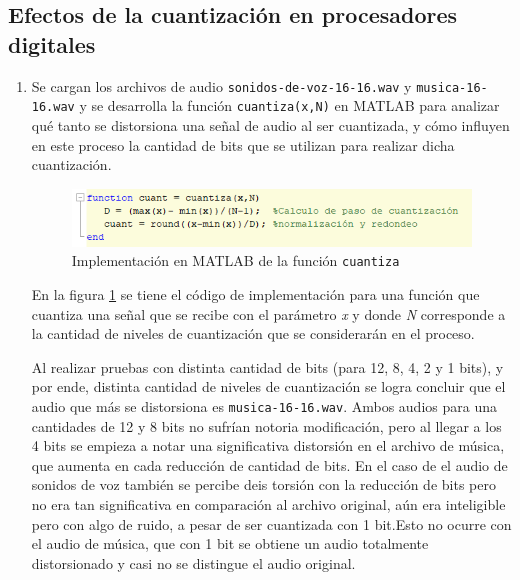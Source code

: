 \subsection{Efectos de la cuantización en procesadores digitales }

\begin{enumerate}

\item 
    Se cargan los archivos de audio \texttt{sonidos-de-voz-16-16.wav} y \texttt{musica-16-16.wav} y se desarrolla la función \texttt{cuantiza(x,N)} en MATLAB para analizar qué tanto se distorsiona una señal de audio al ser cuantizada, y cómo influyen en este proceso la cantidad de bits que se utilizan para realizar dicha cuantización.
    
    \begin{figure}[H]
        \centering
        \includegraphics[scale = 0.7]{imagenes2/cuantiza.png}
        \caption{Implementación en MATLAB de la función \texttt{cuantiza}}
        \label{fig:cuantiza}
    \end{figure}
    
    En la figura \ref{fig:cuantiza} se tiene el código de implementación para una función que cuantiza una señal que se recibe con el parámetro \textit{x}  y donde \textit{N} corresponde a la cantidad de niveles de cuantización que se considerarán en el proceso.
    
    Al realizar pruebas con distinta cantidad de bits  (para 12, 8, 4, 2 y 1 bits), y por ende, distinta cantidad de niveles de cuantización se logra concluir que el audio que más se distorsiona es  \texttt{musica-16-16.wav}. Ambos audios para una cantidades de 12 y 8 bits no sufrían notoria modificación, pero al llegar a los 4 bits se empieza a notar una significativa distorsión en el archivo de música, que aumenta en cada reducción de cantidad de bits. En el caso de el audio de sonidos de voz también se percibe deis torsión con la reducción de bits pero no era tan significativa en comparación al archivo original, aún era inteligible pero con algo de ruido, a pesar de ser cuantizada con 1 bit.Esto no ocurre con el audio de música, que con 1 bit se obtiene un audio totalmente distorsionado y casi no se distingue el audio original.
    
    
    

\end{enumerate}
